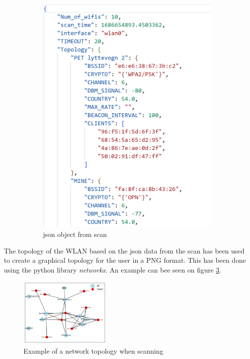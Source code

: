 \begin{figure}[!htbp]
\begin{subfigure}{0.49\textwidth}
         \includegraphics[width=\textwidth]{Latex-Files/Billeder/JSON_object.png}
         \caption{json object from scan}
         \label{json_scan}
     \end{subfigure}
     \caption{}
\end{figure}

The topology of the WLAN based on the json data from the scan has been used to create a graphical topology for the user in a PNG format. This has been done using the python library \textit{networkx}. An example can bee seen on figure \ref{network_topology}.

\begin{figure}[!htbp]
    \centering
    \includegraphics[width=0.4\textwidth]{Latex-Files/Billeder/network_topology.png}
    \caption{Example of a network topology when scanning}
    \label{network_topology}
\end{figure}





